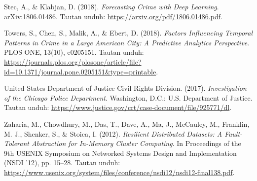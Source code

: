\documentclass[11pt,a4paper]{article}
\begin{document}
\begin{enumerate}[label={[\arabic*]}, leftmargin=2em]
     Stec, A., \& Klabjan, D. (2018). \textit{Forecasting Crime with Deep Learning}. arXiv:1806.01486. Tautan unduh: \url{https://arxiv.org/pdf/1806.01486.pdf}.
    
     Towers, S., Chen, S., Malik, A., \& Ebert, D. (2018). \textit{Factors Influencing Temporal Patterns in Crime in a Large American City: A Predictive Analytics Perspective}. PLOS ONE, 13(10), e0205151. Tautan unduh: \url{https://journals.plos.org/plosone/article/file?id=10.1371/journal.pone.0205151&type=printable}.
    
     United States Department of Justice Civil Rights Division. (2017). \textit{Investigation of the Chicago Police Department}. Washington, D.C.: U.S. Department of Justice. Tautan unduh: \url{https://www.justice.gov/crt/case-document/file/925771/dl}.
    
     Zaharia, M., Chowdhury, M., Das, T., Dave, A., Ma, J., McCauley, M., Franklin, M. J., Shenker, S., \& Stoica, I. (2012). \textit{Resilient Distributed Datasets: A Fault-Tolerant Abstraction for In-Memory Cluster Computing}. In Proceedings of the 9th USENIX Symposium on Networked Systems Design and Implementation (NSDI '12), pp. 15--28. Tautan unduh: \url{https://www.usenix.org/system/files/conference/nsdi12/nsdi12-final138.pdf}.
\end{enumerate}
\end{document}
